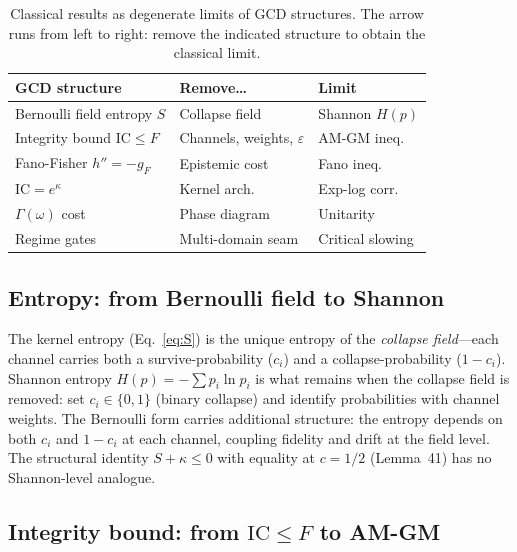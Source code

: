 \documentclass[
  aps,
  prd,
  twocolumn,
  superscriptaddress,
  nofootinbib,
  floatfix
]{revtex4-2}
\newcommand{\Gam}{\Gamma}
\newcommand{\eps}{\varepsilon}
\newcommand{\IC}{\mathrm{IC}}
\newcommand{\gF}{g_{\!F}}
\begin{document}
\begin{table}[t]
\caption{\label{tab:degenerate}Classical results as degenerate limits
of GCD structures.  The arrow runs from left to right: remove the
indicated structure to obtain the classical limit.}
\begin{ruledtabular}
\begin{tabular}{p{2.0cm}p{2.2cm}p{2.5cm}}
GCD structure & Remove\ldots & Limit \\
\midrule
Bernoulli field entropy $S$ &
  Collapse field &
  Shannon $H(p)$ \\[3pt]
Integrity bound $\IC \leq F$ &
  Channels, weights, $\eps$ &
  AM-GM ineq. \\[3pt]
Fano-Fisher $h'' = -\gF$ &
  Epistemic cost &
  Fano ineq. \\[3pt]
$\IC = e^\kappa$ &
  Kernel arch. &
  Exp-log corr. \\[3pt]
$\Gam(\omega)$ cost &
  Phase diagram &
  Unitarity \\[3pt]
Regime gates &
  Multi-domain seam &
  Critical slowing
\end{tabular}
\end{ruledtabular}
\end{table}

\subsection{Entropy: from Bernoulli field to Shannon}

The kernel entropy (Eq.~\ref{eq:S}) is the unique entropy of the
\emph{collapse field}---each channel carries both a
survive-probability ($c_i$) and a collapse-probability ($1 - c_i$).
Shannon entropy $H(p) = -\sum p_i \ln p_i$ is what remains when the
collapse field is removed: set $c_i \in \{0, 1\}$ (binary collapse)
and identify probabilities with channel weights.  The Bernoulli form
carries additional structure: the entropy depends on both $c_i$ and
$1 - c_i$ at each channel, coupling fidelity and drift at the field
level.  The structural identity $S + \kappa \leq 0$ with equality at
$c = 1/2$ (Lemma~41) has no Shannon-level analogue.

\subsection{Integrity bound: from \texorpdfstring{$\IC \leq F$}{IC <= F} to AM-GM}
\end{document}
